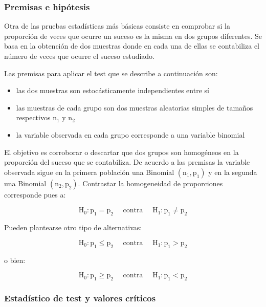 \documentclass[
]{article}
\providecommand{\tightlist}{%
  \setlength{\itemsep}{0pt}\setlength{\parskip}{0pt}}
\begin{document}
\subsubsection{Premisas e hipótesis}\label{premisas-e-hipuxf3tesis-1}

Otra de las pruebas estadísticas más básicas consiste en comprobar si la proporción de veces que ocurre un suceso es la misma en dos grupos diferentes. Se basa en la obtención de dos muestras donde en cada una de ellas se contabiliza el número de veces que ocurre el suceso estudiado.

Las premisas para aplicar el test que se describe a continuación son:

\begin{itemize}
\tightlist
\item
  las dos muestras son estocásticamente independientes entre sí
\item
  las muestras de cada grupo son dos muestras aleatorias simples de tamaños respectivos \(\mathrm{n}_{1}\) y \(\mathrm{n}_{2}\)
\item
  la variable observada en cada grupo corresponde a una variable binomial
\end{itemize}

El objetivo es corroborar o descartar que dos grupos son homogéneos en la proporción del suceso que se contabiliza. De acuerdo a las premisas la variable observada sigue en la primera población una Binomial \(\left(\mathrm{n}_{1}, \mathrm{p}_{1}\right)\) y en la segunda una Binomial \(\left(\mathrm{n}_{2}, \mathrm{p}_{2}\right)\). Contrastar la homogeneidad de proporciones corresponde pues a:

\[
\mathrm{H}_{0}: \mathrm{p}_{1}=\mathrm{p}_{2} \quad \text { contra } \quad \mathrm{H}_{1}: \mathrm{p}_{1} \neq \mathrm{p}_{2}
\]

Pueden plantearse otro tipo de alternativas:

\[
\mathrm{H}_{0}: \mathrm{p}_{1} \leq \mathrm{p}_{2} \quad \text { contra } \quad \mathrm{H}_{1}: \mathrm{p}_{1}>\mathrm{p}_{2}
\]

o bien:

\[
\mathrm{H}_{0}: \mathrm{p}_{1} \geq \mathrm{p}_{2} \quad \text { contra } \quad \mathrm{H}_{1}: \mathrm{p}_{1}<\mathrm{p}_{2}
\]

\subsubsection{Estadístico de test y valores críticos}\label{estaduxedstico-de-test-y-valores-cruxedticos-2}
\end{document}
